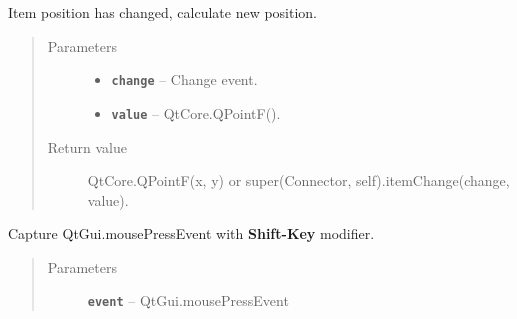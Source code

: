 \documentclass[a4paper,10pt,english]{sphinxmanual}
\begin{document}
\begin{fulllineitems}
\begin{fulllineitems}
\begin{quote}
\begin{description}
\end{description}\end{quote}

\end{fulllineitems}


\begin{fulllineitems}
\label{model_link:model.AbstractItem.Connector.itemChange}
Item position has changed, calculate new position.
\begin{quote}\begin{description}
\item[{Parameters}] \leavevmode\begin{itemize}
\item {} 
\textbf{\texttt{change}} -- Change event.

\item {} 
\textbf{\texttt{value}} -- QtCore.QPointF().

\end{itemize}

\item[{Return value}] \leavevmode
QtCore.QPointF(x, y) or super(Connector, self).itemChange(change, value).

\end{description}\end{quote}

\end{fulllineitems}


\begin{fulllineitems}
\label{model_link:model.AbstractItem.Connector.mousePressEvent}
Capture QtGui.mousePressEvent with \textbf{Shift-Key} modifier.
\begin{quote}\begin{description}
\item[{Parameters}] \leavevmode
\textbf{\texttt{event}} -- QtGui.mousePressEvent

\end{description}\end{quote}

\end{fulllineitems}


\end{fulllineitems}
\end{document}
